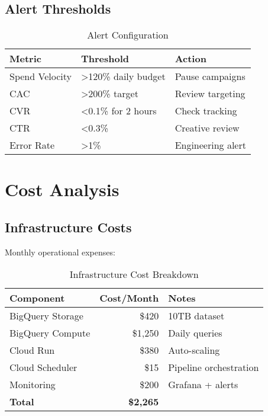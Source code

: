 \documentclass[11pt,a4paper]{report}
\begin{document}
\section{Alert Thresholds}

\begin{table}[H]
\centering
\begin{tabular}{|l|l|l|}
\hline
\rowcolor{aelpred!20}
\textbf{Metric} & \textbf{Threshold} & \textbf{Action} \\
\hline
Spend Velocity & >120\% daily budget & Pause campaigns \\
CAC & >200\% target & Review targeting \\
CVR & <0.1\% for 2 hours & Check tracking \\
CTR & <0.3\% & Creative review \\
Error Rate & >1\% & Engineering alert \\
\hline
\end{tabular}
\caption{Alert Configuration}
\end{table}

\clearpage

\chapter{Cost Analysis}

\section{Infrastructure Costs}

Monthly operational expenses:

\begin{table}[H]
\centering
\begin{tabular}{|l|r|l|}
\hline
\rowcolor{aelpblue!20}
\textbf{Component} & \textbf{Cost/Month} & \textbf{Notes} \\
\hline
BigQuery Storage & \$420 & 10TB dataset \\
BigQuery Compute & \$1,250 & Daily queries \\
Cloud Run & \$380 & Auto-scaling \\
Cloud Scheduler & \$15 & Pipeline orchestration \\
Monitoring & \$200 & Grafana + alerts \\
\hline
\textbf{Total} & \textbf{\$2,265} & \\
\hline
\end{tabular}
\caption{Infrastructure Cost Breakdown}
\end{table}
\end{document}
